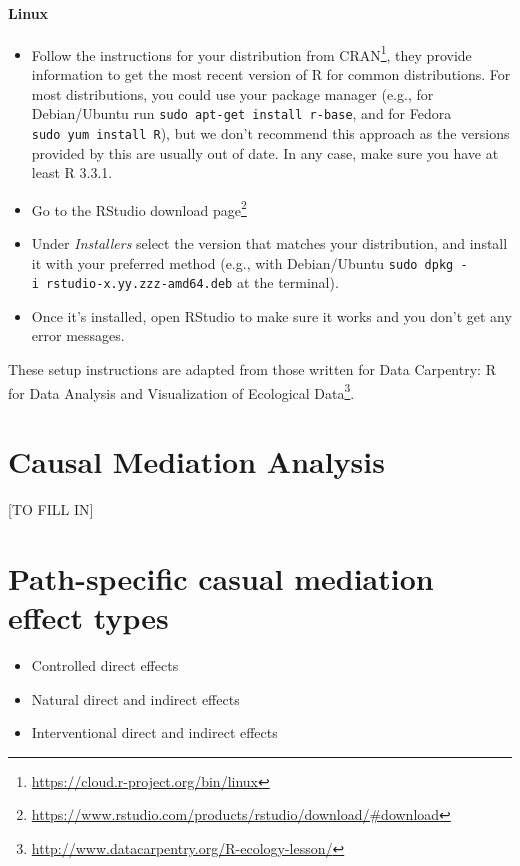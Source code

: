 \documentclass[
  12pt, krantz2,
]{book}
\providecommand{\tightlist}{%
  \setlength{\itemsep}{0pt}\setlength{\parskip}{0pt}}
\renewcommand{\href}[2]{#2\footnote{\url{#1}}}
\theoremstyle{definition}
\theoremstyle{definition}
\theoremstyle{definition}
\newcommand{\1}{\mathbbm{1}}
\begin{document}
\hypertarget{linux}{%
\subsubsection{Linux}\label{linux}}

\begin{itemize}
\tightlist
\item
  Follow the instructions for your distribution
  from \href{https://cloud.r-project.org/bin/linux}{CRAN}, they provide information
  to get the most recent version of R for common distributions. For most
  distributions, you could use your package manager (e.g., for Debian/Ubuntu run
  \texttt{sudo\ apt-get\ install\ r-base}, and for Fedora \texttt{sudo\ yum\ install\ R}), but we
  don't recommend this approach as the versions provided by this are
  usually out of date. In any case, make sure you have at least R 3.3.1.
\item
  Go to the \href{https://www.rstudio.com/products/rstudio/download/\#download}{RStudio download
  page}
\item
  Under \emph{Installers} select the version that matches your distribution, and
  install it with your preferred method (e.g., with Debian/Ubuntu \texttt{sudo\ dpkg\ -i\ rstudio-x.yy.zzz-amd64.deb} at the terminal).
\item
  Once it's installed, open RStudio to make sure it works and you don't get any
  error messages.
\end{itemize}

These setup instructions are adapted from those written for \href{http://www.datacarpentry.org/R-ecology-lesson/}{Data Carpentry: R
for Data Analysis and Visualization of Ecological
Data}.

\hypertarget{mediation}{%
\chapter{Causal Mediation Analysis}\label{mediation}}

{[}TO FILL IN{]}

\hypertarget{estimands}{%
\chapter{Path-specific casual mediation effect types}\label{estimands}}

\begin{itemize}
\tightlist
\item
  Controlled direct effects
\item
  Natural direct and indirect effects
\item
  Interventional direct and indirect effects
\end{itemize}
\end{document}
